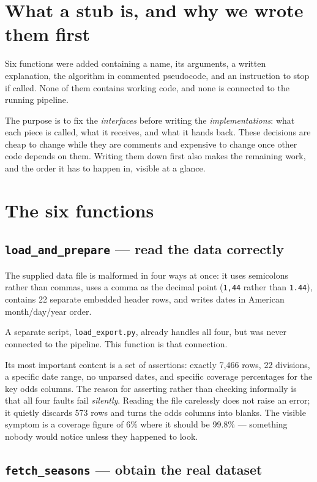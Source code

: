 \documentclass[11pt,a4paper]{article}
\newcommand{\code}[1]{\texttt{#1}}
\begin{document}
\section{What a stub is, and why we wrote them first}

Six functions were added containing a name, its arguments, a written
explanation, the algorithm in commented pseudocode, and an instruction to
stop if called. None of them contains working code, and none is connected to
the running pipeline.

The purpose is to fix the \emph{interfaces} before writing the
\emph{implementations}: what each piece is called, what it receives, and what
it hands back. These decisions are cheap to change while they are comments
and expensive to change once other code depends on them. Writing them down
first also makes the remaining work, and the order it has to happen in,
visible at a glance.

\section{The six functions}

\subsection{\code{load\_and\_prepare} --- read the data correctly}

The supplied data file is malformed in four ways at once: it uses semicolons
rather than commas, uses a comma as the decimal point (\code{1,44} rather
than \code{1.44}), contains 22 separate embedded header rows, and writes dates
in American month/day/year order.

A separate script, \code{load\_export.py}, already handles all four, but was
never connected to the pipeline. This function is that connection.

Its most important content is a set of assertions: exactly 7{,}466 rows, 22
divisions, a specific date range, no unparsed dates, and specific coverage
percentages for the key odds columns. The reason for asserting rather than
checking informally is that all four faults fail \emph{silently}. Reading the
file carelessly does not raise an error; it quietly discards 573 rows and
turns the odds columns into blanks. The visible symptom is a coverage figure
of 6\% where it should be 99.8\% --- something nobody would notice unless they
happened to look.

\subsection{\code{fetch\_seasons} --- obtain the real dataset}
\end{document}

